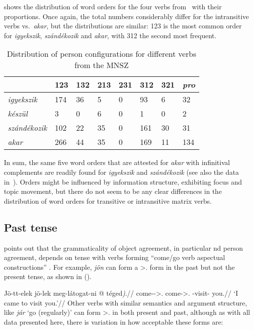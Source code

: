  shows the distribution of word orders for the four
verbs from~ with their proportions. Once again, the
total numbers considerably differ for the intransitive verbs vs.\ \emph{akar},
but the distributions are similar: 123 is the most common order for
\emph{igyekszik}, \emph{szándékozik} and \emph{akar}, with 312 the second most
frequent.

\begin{table}[htpb]
    \centering
    \begin{tabular}{llllllll}
    \toprule
        & 123 & 132 & 213 & 231 & 312 & 321 & \emph{pro} \\
    \midrule
    \emph{igyekszik} & 174 & 36 & 5 & 0 & 93 & 6 & 32\\
    \emph{készül} & 3 & 0 & 6 & 0 & 1 & 0 & 2 \\
    \emph{szándékozik} & 102 & 22 & 35 & 0 & 161 & 30 & 31 \\
    \midrule
    \emph{akar} & 266 & 44 & 35 & 0 & 169 & 11 & 134 \\
    \bottomrule
    \end{tabular}
    \caption{Distribution of person configurations for different verbs
    from the \gls{MNSZ}}\label{tb:mnsz-order-counts}
\end{table}

In sum, the same five word orders that are attested for \emph{akar} with
infinitival complements are readily found for \emph{igyekszik} and
\emph{szándékozik} (see also the data in~). Orders might be
influenced by information structure, exhibiting focus and topic movement, but
there do not seem to be any clear differences in the distribution of word
orders for transitive or intransitive matrix verbs.

\subsection{Past tense}\label{sub:past-tense}

\Textcite{denDikken2004} points out that the grammaticality of object
agreement, in particular \Second{}nd person agreement, depends on tense with
verbs forming \enquote{come/go verb aspectual constructions} . For example,
\emph{jön} can form a \Fsg>\Second.\Obj{} form in the past but not the present
tense, as shown in (\nextx).

\ex
    \begingl
        \gla 	Jö-tt-elek \nogloss{/ } \ljudge*jö-lek meg-látogat-ni \nogloss{(} @ téged\emph{)}.//
        \glb 	come-\Pst-\Fsg>\Second.\Obj{} come-\Fsg>\Second.\Obj{} \Vm-visit-\Inf{} you.\Acc{}//
        \glft 	\enquote*{I came to visit you.}//
    \endgl
\xe
Other verbs with similar semantics and argument structure, like \emph{jár}
\enquote*{go (regularly)} can form \Fsg>\Second.\Obj{} in both present and
past, although as with all data presented here, there is variation in how
acceptable these forms are:

